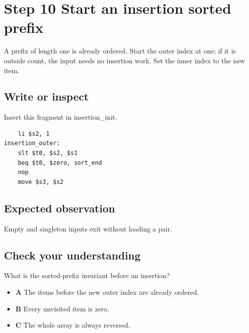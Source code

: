 \section{Step 10 Start an insertion sorted
  prefix}\label{009-sorting-visualizer-s10-step-10-start-an-insertion-sorted-prefix}

A prefix of length one is already ordered. Start the outer index at one;
if it is outside count, the input needs no insertion work. Set the inner
index to the new item.

\subsection{Write or
  inspect}\label{009-sorting-visualizer-s10-write-or-inspect}

Insert this fragment in insertion\_init.

\begin{verbatim}
    li $s2, 1
insertion_outer:
    slt $t0, $s2, $s1
    beq $t0, $zero, sort_end
    nop
    move $s3, $s2
\end{verbatim}

\subsection{Expected
  observation}\label{009-sorting-visualizer-s10-expected-observation}

Empty and singleton inputs exit without loading a pair.

\subsection{Check your
  understanding}\label{009-sorting-visualizer-s10-check-your-understanding}

What is the sorted-prefix invariant before an insertion?

\begin{itemize}
  \tightlist
  \item
        \textbf{A} The items before the new outer index are already ordered.
  \item
        \textbf{B} Every unvisited item is zero.
  \item
        \textbf{C} The whole array is always reversed.
\end{itemize}
